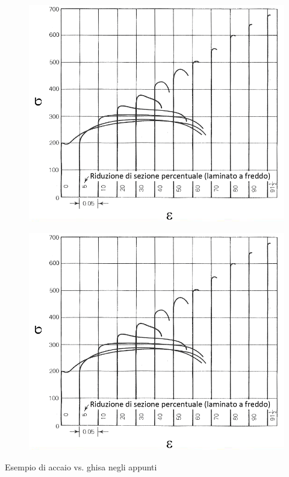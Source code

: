 \documentclass{article}
\begin{document}
{\begin{figure}[!h]
            \end{figure}
            \begin{figure}[!h]
                    \centering
                    \includegraphics[width=.85\linewidth]{Grafico di Sforzo v. Allungamento con cambio di Incrudimento.png}
            \end{figure}
            \begin{figure}[!h]
                    \centering
                    \includegraphics[width=.85\linewidth]{Grafico di Sforzo v. Allungamento con cambio di Incrudimento.png}
            \end{figure}
            Esempio di accaio vs. ghisa negli appunti
}
\end{document}
